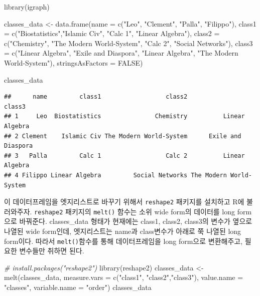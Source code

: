 \documentclass[
]{book}
\newenvironment{Shaded}{\begin{snugshade}}{\end{snugshade}}
\newcommand{\AttributeTok}[1]{\textcolor[rgb]{0.77,0.63,0.00}{#1}}
\newcommand{\CommentTok}[1]{\textcolor[rgb]{0.56,0.35,0.01}{\textit{#1}}}
\newcommand{\ConstantTok}[1]{\textcolor[rgb]{0.00,0.00,0.00}{#1}}
\newcommand{\FunctionTok}[1]{\textcolor[rgb]{0.00,0.00,0.00}{#1}}
\newcommand{\NormalTok}[1]{#1}
\newcommand{\OtherTok}[1]{\textcolor[rgb]{0.56,0.35,0.01}{#1}}
\newcommand{\StringTok}[1]{\textcolor[rgb]{0.31,0.60,0.02}{#1}}
\begin{document}
\begin{Shaded}
\begin{Highlighting}[]
\FunctionTok{library}\NormalTok{(igraph)}

\NormalTok{classes\_data }\OtherTok{\textless{}{-}} \FunctionTok{data.frame}\NormalTok{(}\AttributeTok{name =} \FunctionTok{c}\NormalTok{(}\StringTok{"Leo"}\NormalTok{, }\StringTok{"Clement"}\NormalTok{, }\StringTok{"Palla"}\NormalTok{, }\StringTok{"Filippo"}\NormalTok{), }
                           \AttributeTok{class1 =} \FunctionTok{c}\NormalTok{(}\StringTok{"Biostatistics"}\NormalTok{,}\StringTok{"Islamic Civ"}\NormalTok{, }\StringTok{"Calc 1"}\NormalTok{, }\StringTok{"Linear Algebra"}\NormalTok{), }
                           \AttributeTok{class2 =} \FunctionTok{c}\NormalTok{(}\StringTok{"Chemistry"}\NormalTok{, }\StringTok{"The Modern World{-}System"}\NormalTok{, }\StringTok{"Calc 2"}\NormalTok{, }\StringTok{"Social Networks"}\NormalTok{), }
                           \AttributeTok{class3 =} \FunctionTok{c}\NormalTok{(}\StringTok{"Linear Algebra"}\NormalTok{, }\StringTok{"Exile and Diaspora"}\NormalTok{, }\StringTok{"Linear Algebra"}\NormalTok{, }\StringTok{"The Modern World{-}System"}\NormalTok{), }
                           \AttributeTok{stringsAsFactors =} \ConstantTok{FALSE}\NormalTok{)}

\NormalTok{classes\_data}
\end{Highlighting}
\end{Shaded}

\begin{verbatim}
##      name         class1                  class2                  class3
## 1     Leo  Biostatistics               Chemistry          Linear Algebra
## 2 Clement    Islamic Civ The Modern World-System      Exile and Diaspora
## 3   Palla         Calc 1                  Calc 2          Linear Algebra
## 4 Filippo Linear Algebra         Social Networks The Modern World-System
\end{verbatim}

이 데이터프레임을 엣지리스트로 바꾸기 위해서 \texttt{reshape2} 패키지를 설치하고 R에 불러와주자. \texttt{reshape2} 패키지의 \texttt{melt()} 함수는 소위 wide form의 데이터를 long form으로 바꿔준다. classes\_data 형태가 현재에는 class1, class2, class3의 변수가 옆으로 나열된 wide form인데, 엣지리스트는 name과 class변수가 아래로 쭉 나열된 long form이다. 따라서 \texttt{melt()}함수를 통해 데이터프레임을 long form으로 변환해주고, 필요한 변수들만 취하면 된다.

\begin{Shaded}
\begin{Highlighting}[]
\CommentTok{\# install.packages("reshape2")}
\FunctionTok{library}\NormalTok{(reshape2)}
\NormalTok{classes\_data }\OtherTok{\textless{}{-}} \FunctionTok{melt}\NormalTok{(classes\_data, }\AttributeTok{measure.vars =} \FunctionTok{c}\NormalTok{(}\StringTok{"class1"}\NormalTok{, }\StringTok{"class2"}\NormalTok{,}\StringTok{"class3"}\NormalTok{), }\AttributeTok{value.name =} \StringTok{"classes"}\NormalTok{, }\AttributeTok{variable.name =} \StringTok{"order"}\NormalTok{)}
\NormalTok{classes\_data}
\end{Highlighting}
\end{Shaded}
\end{document}
